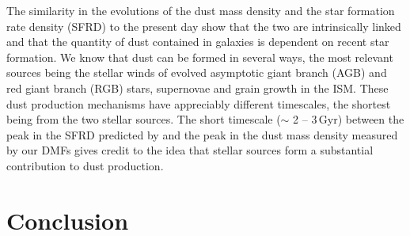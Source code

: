 The similarity in the evolutions of the dust mass density and the star formation rate density (SFRD) to the present day show that the two are intrinsically linked and that the quantity of dust contained in galaxies is dependent on recent star formation. We know that dust can be formed in several ways, the most relevant sources being the stellar winds of evolved asymptotic giant branch (AGB) and red giant branch (RGB) stars, supernovae and grain growth in the ISM. These dust production mechanisms have appreciably different timescales, the shortest being from the two stellar sources. The short timescale ($\sim$ 2 -- 3\,Gyr) between the peak in the SFRD predicted by \citealt{Madau_2014} and the peak in the dust mass density measured by our DMFs gives credit to the idea that stellar sources form a substantial contribution to dust production. 

\section{Conclusion}

